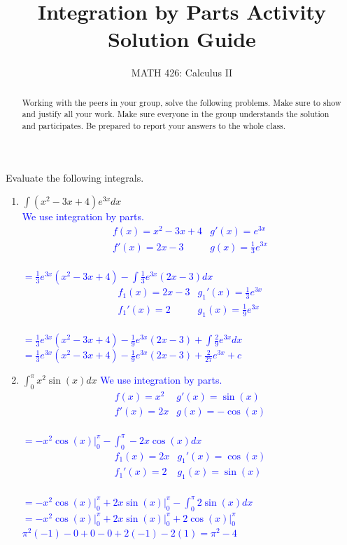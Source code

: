 \documentclass{ximera}
\title{Integration by Parts Activity Solution Guide}
\author{MATH 426: Calculus II}
\begin{document}
\begin{abstract}
   Working with the peers in your group, solve the following problems. Make sure to show and justify all your work. Make sure everyone in the group understands the solution and participates. Be prepared to report your answers to the whole class. 
\end{abstract}
\maketitle



\begin{exercise}
    Evaluate the following integrals.
    \begin{enumerate}
        \item $\displaystyle \int (x^2-3x+4)e^{3x}dx$\\
        \textcolor{blue}{We use integration by parts.
        \[\begin{array}{c|c}
           f(x)=x^2-3x+4  & g'(x)=e^{3x} \\ \hline
           f'(x)=2x-3  &  g(x)=\frac13e^{3x}
        \end{array}\]\\
        $=\frac13e^{3x}(x^2-3x+4)-\displaystyle\int\frac13e^{3x}(2x-3)dx$\\
         \[\begin{array}{c|c}
           f_1(x)=2x-3  & g_1'(x)=\frac13e^{3x}  \\\hline
           f_1'(x)=2  &  g_1(x)=\frac19e^{3x}
        \end{array}\]\\
        $=\frac13e^{3x}(x^2-3x+4)-\frac19e^{3x}(2x-3)+\displaystyle\int\frac29e^{3x}dx$\\
        $=\frac13e^{3x}(x^2-3x+4)-\frac19e^{3x}(2x-3)+\frac2{27}e^{3x}+c$\\}
        
        \item $\displaystyle \int_0^\pi x^2\sin(x)dx$
        \textcolor{blue}{We use integration by parts.
        \[\begin{array}{c|c}
            f(x)=x^2 & g'(x)=\sin(x) \\ \hline
            f'(x)=2x & g(x)=-\cos(x)
        \end{array}\]\\
        $=-x^2\cos(x)\bigg|_0^{\pi}-\displaystyle\int_0^{\pi} -2x\cos(x)dx$\\
        \[\begin{array}{c|c}
            f_1(x)=2x & g_1'(x)=\cos(x) \\ \hline
            f_1'(x)=2 & g_1(x)=\sin(x)
        \end{array}\]\\
         $=-x^2\cos(x)\bigg|_0^{\pi}+2x\sin(x)\bigg|_0^{\pi}-\displaystyle\int_0^{\pi} 2\sin(x)dx$\\
         $=-x^2\cos(x)\bigg|_0^{\pi}+2x\sin(x)\bigg|_0^{\pi}+2\cos(x)\bigg|_0^{\pi}$\\
         $\pi^2(-1)-0+0-0+2(-1)-2(1)=\pi^2-4$}
        

\end{enumerate}
\end{exercise}
\end{document}
